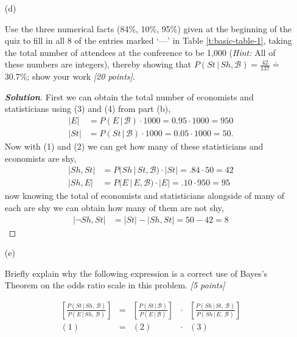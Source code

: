 \documentclass[12pt]{article}
\newcommand{\given}{\, | \,}
\newenvironment{solution}{\begin{proof}[\textbf{\textit{Solution}}] }{\end{proof}}
\begin{document}
\begin{itemize}

\item[(d)]

Use the three numerical facts (84\%, 10\%, 95\%) given at the beginning of the quiz to fill in all 8 of the entries marked `---' in Table \ref{t:basic-table-1}, taking the total number of attendees at the conference to be 1,000 (\textit{Hint:} All of these numbers are integers), thereby showing that $P ( St \given Sh, \mathcal{ B } ) = \frac{ 42 }{ 137 } \doteq$ 30.7\%; show your work \textit{[20 points]}.

\begin{solution}
    First we can obtain the total number of economists and statisticians using (3) and (4) from part (b),
    \begin{align*}
        |E| &= P(E \given \mathcal{B}) \cdot 1000 = 0.95 \cdot 1000 = 950 \\
        |St| &= P(St \given \mathcal{B}) \cdot 1000 = 0.05 \cdot 1000 = 50.
    \end{align*}
    Now with (1) and (2) we can get how many of these statisticians and economists are shy,
    \begin{align*}
        |Sh, St| &= P(Sh \given St, \mathcal{B}) \cdot |St| = .84 \cdot 50 = 42 \\
        |Sh, E| &= P(E \given E, \mathcal{B}) \cdot |E| = .10 \cdot 950 = 95
    \end{align*}
    now knowing the total of economists and statisticians alongside of many of each are shy we can obtain how many of them are not shy,
    \begin{align*}
        |\neg Sh, St| &= |St| - |Sh, St| = 50 - 42 = 8
    \end{align*}
\end{solution}

\vspace*{1.5in}

\item[(e)]

Briefly explain why the following expression is a correct use of Bayes's Theorem on the odds ratio scale in this problem. \textit{[5 points]} \vspace*{-0.1in}

\begin{center}

\Large

\[
\begin{array}{ccccc}
\left[ \frac{ P ( St \given Sh, \, \mathcal{ B } ) }{ P ( E \given Sh, \, \mathcal{ B } ) } \right] & = & \left[ \frac{ P ( St \given \mathcal{ B } ) }{ P ( E \given \mathcal{ B } ) } \right] & \cdot & \left[ \frac{ P ( Sh \given St, \, \mathcal{ B } ) }{ P ( Sh \given E, \, \mathcal{ B } ) } \right] \\( 1 ) & = & ( 2 ) & \cdot & ( 3 )
\end{array}
\]


\end{center}
\end{itemize}
\end{document}

